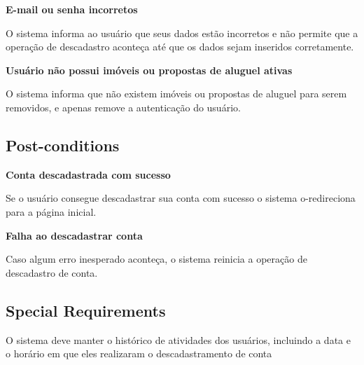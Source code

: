 \textbf{E-mail ou senha incorretos}

O sistema informa ao usuário que seus dados estão incorretos e não permite que a operação
de descadastro aconteça até que os dados sejam inseridos corretamente.

\textbf{Usuário não possui imóveis ou propostas de aluguel ativas}

O sistema informa que não existem imóveis ou propostas de aluguel para serem removidos, e
apenas remove a autenticação do usuário.

\subsection*{Post-conditions}

\textbf{Conta descadastrada com sucesso}

Se o usuário consegue descadastrar sua conta com sucesso o sistema o-redireciona para a
página inicial.

\textbf{Falha ao descadastrar conta}

Caso algum erro inesperado aconteça, o sistema reinicia a operação de descadastro de
conta.
\subsection*{Special Requirements} 
O sistema deve manter o histórico de atividades dos usuários, incluindo a data e o horário em
que eles realizaram o descadastramento de conta